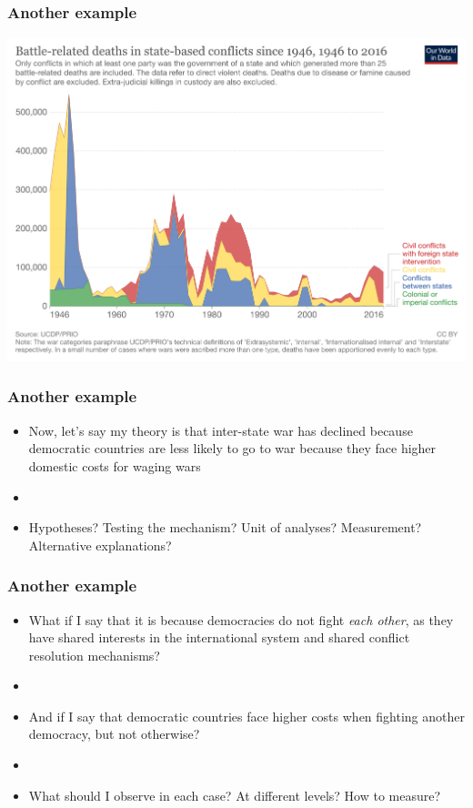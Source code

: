 \documentclass[aspectratio=43]{beamer}
\begin{document}
\begin{frame}
\frametitle{Another example}
\centering

\includegraphics[width = \textwidth]{../img/battledeaths}

\end{frame}

\begin{frame}
\frametitle{Another example}
\centering

\begin{itemize}
  \item Now, let's say my theory is that inter-state war has declined because democratic countries are less likely to go to war because they face higher domestic costs for waging wars
  \item[]
  \item Hypotheses? Testing the mechanism? Unit of analyses? Measurement? Alternative explanations?
\end{itemize}

\end{frame}

\begin{frame}
\frametitle{Another example}
\centering

\begin{itemize}
  \item What if I say that it is because democracies do not fight \textit{each other}, as they have shared interests in the international system and shared conflict resolution mechanisms?
  \item[]
  \item And if I say that democratic countries face higher costs when fighting another democracy, but not otherwise?
  \item[]
  \item What should I observe in each case? At different levels? How to measure?
\end{itemize}

\end{frame}
\end{document}

